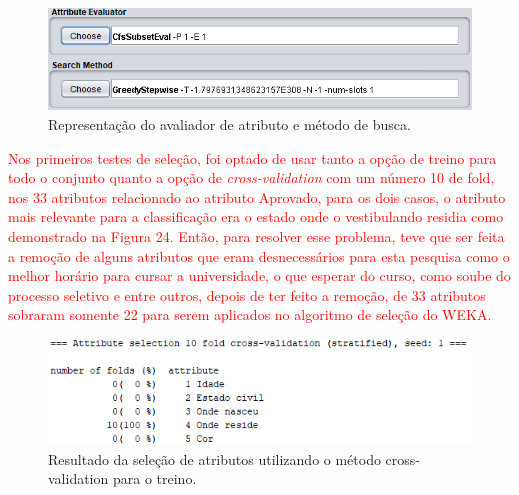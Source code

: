 \par
\begin{figure}[!htp]
	\begin{center}
    \caption{\label{fig:waveform_fig} Representação do avaliador de atributo e método de busca.}
	\includegraphics[scale=0.90]{Figuras/Avaliador_de_atributo.png}
	\end{center}
\end{figure}

\par
\textcolor{red}{Nos primeiros testes de seleção, foi optado de usar tanto a opção de treino para todo o conjunto quanto a opção de \textit{cross-validation} com um número 10 de fold, nos 33 atributos relacionado ao atributo Aprovado, para os dois casos, o atributo mais relevante para a classificação era o estado onde o vestibulando residia como demonstrado na Figura 24. Então, para resolver esse problema, teve que ser feita a remoção de alguns atributos que eram desnecessários para esta pesquisa como o melhor horário para cursar a universidade, o que esperar do curso, como soube do processo seletivo e entre outros, depois de ter feito a remoção, de 33 atributos sobraram somente 22 para serem aplicados no algoritmo de seleção do WEKA.}

\par
\begin{figure}[!htp]
	\begin{center}
    \caption{\label{fig:waveform_fig} Resultado da seleção de atributos utilizando o método cross-validation para o treino.}
	\includegraphics[scale=0.99]{Figuras/33_atributos.png}
	\end{center}
\end{figure}

\par
\textcolor{red}{}

